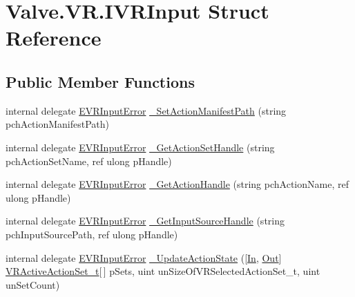 \hypertarget{struct_valve_1_1_v_r_1_1_i_v_r_input}{}\section{Valve.\+V\+R.\+I\+V\+R\+Input Struct Reference}
\label{struct_valve_1_1_v_r_1_1_i_v_r_input}
\subsection*{Public Member Functions}
\begin{DoxyCompactItemize}
\item 
internal delegate \mbox{\hyperlink{namespace_valve_1_1_v_r_a592d7f4189b8346d6c96dbdbaa35bc1b}{E\+V\+R\+Input\+Error}} \mbox{\hyperlink{struct_valve_1_1_v_r_1_1_i_v_r_input_abe386c0a304c243f737dbfda0340428a}{\+\_\+\+Set\+Action\+Manifest\+Path}} (string pch\+Action\+Manifest\+Path)
\item 
internal delegate \mbox{\hyperlink{namespace_valve_1_1_v_r_a592d7f4189b8346d6c96dbdbaa35bc1b}{E\+V\+R\+Input\+Error}} \mbox{\hyperlink{struct_valve_1_1_v_r_1_1_i_v_r_input_ab3c6223a018a82a60946167267376579}{\+\_\+\+Get\+Action\+Set\+Handle}} (string pch\+Action\+Set\+Name, ref ulong p\+Handle)
\item 
internal delegate \mbox{\hyperlink{namespace_valve_1_1_v_r_a592d7f4189b8346d6c96dbdbaa35bc1b}{E\+V\+R\+Input\+Error}} \mbox{\hyperlink{struct_valve_1_1_v_r_1_1_i_v_r_input_a21380aa596ca906ff4b10666cf88065e}{\+\_\+\+Get\+Action\+Handle}} (string pch\+Action\+Name, ref ulong p\+Handle)
\item 
internal delegate \mbox{\hyperlink{namespace_valve_1_1_v_r_a592d7f4189b8346d6c96dbdbaa35bc1b}{E\+V\+R\+Input\+Error}} \mbox{\hyperlink{struct_valve_1_1_v_r_1_1_i_v_r_input_a60fb16bdfa85d70a30f566ddd0c52fe2}{\+\_\+\+Get\+Input\+Source\+Handle}} (string pch\+Input\+Source\+Path, ref ulong p\+Handle)
\item 
internal delegate \mbox{\hyperlink{namespace_valve_1_1_v_r_a592d7f4189b8346d6c96dbdbaa35bc1b}{E\+V\+R\+Input\+Error}} \mbox{\hyperlink{struct_valve_1_1_v_r_1_1_i_v_r_input_a71824d045beb4928cad94006a0e435a6}{\+\_\+\+Update\+Action\+State}} (\mbox{[}\mbox{\hyperlink{namespace_valve_1_1_v_r_a1e6192cb5ddaf204afab87ccb5728780aefeb369cccbd560588a756610865664c}{In}}, \mbox{\hyperlink{namespace_valve_1_1_v_r_a1e6192cb5ddaf204afab87ccb5728780a7c147cda9e49590f6abe83d118b7353b}{Out}}\mbox{]} \mbox{\hyperlink{struct_valve_1_1_v_r_1_1_v_r_active_action_set__t}{V\+R\+Active\+Action\+Set\+\_\+t}}\mbox{[}$\,$\mbox{]} p\+Sets, uint un\+Size\+Of\+V\+R\+Selected\+Action\+Set\+\_\+t, uint un\+Set\+Count)

\end{DoxyCompactItemize}
